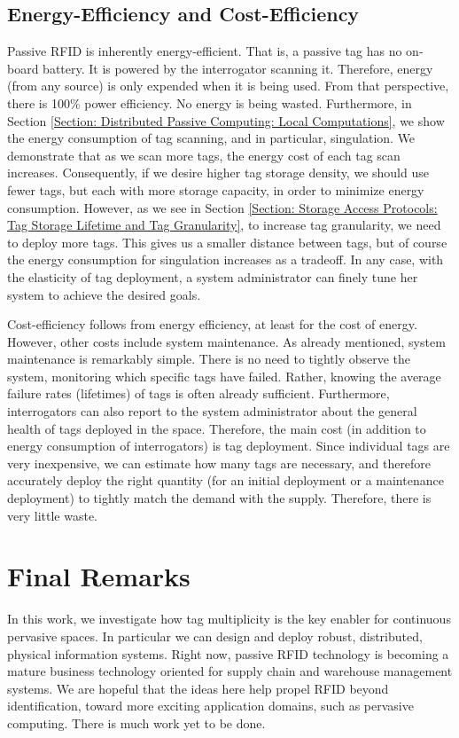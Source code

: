 \subsection{Energy-Efficiency and Cost-Efficiency}
Passive RFID is inherently energy-efficient. That is, a passive tag has no on-board battery. It is powered by the interrogator scanning it. Therefore, energy (from any source) is only expended when it is being used. From that perspective, there is 100\% power efficiency. No energy is being wasted. Furthermore, in Section \ref{Section: Distributed Passive Computing: Local Computations}, we show the energy consumption of tag scanning, and in particular, singulation. We demonstrate that as we scan more tags, the energy cost of each tag scan increases. Consequently, if we desire higher tag storage density, we should use fewer tags, but each with more storage capacity, in order to minimize energy consumption. However, as we see in Section \ref{Section: Storage Access Protocols: Tag Storage Lifetime and Tag Granularity}, to increase tag granularity, we need to deploy more tags. This gives us a smaller distance between tags, but of course the energy consumption for singulation increases as a tradeoff. In any case, with the elasticity of tag deployment, a system administrator can finely tune her system to achieve the desired goals.

Cost-efficiency follows from energy efficiency, at least for the cost of energy. However, other costs include system maintenance. As already mentioned, system maintenance is remarkably simple. There is no need to tightly observe the system, monitoring which specific tags have failed. Rather, knowing the average failure rates (lifetimes) of tags is often already sufficient. Furthermore, interrogators can also report to the system administrator about the general health of tags deployed in the space. Therefore, the main cost (in addition to energy consumption of interrogators) is tag deployment. Since individual tags are very inexpensive, we can estimate how many tags are necessary, and therefore accurately deploy the right quantity (for an initial deployment or a maintenance deployment) to tightly match the demand with the supply. Therefore, there is very little waste.

\section{Final Remarks}
In this work, we investigate how tag multiplicity is the key enabler for continuous pervasive spaces. In particular we can design and deploy robust, distributed, physical information systems. Right now, passive RFID technology is becoming a mature business technology oriented for supply chain and warehouse management systems. We are hopeful that the ideas here help propel RFID beyond identification, toward more exciting application domains, such as pervasive computing. There is much work yet to be done.